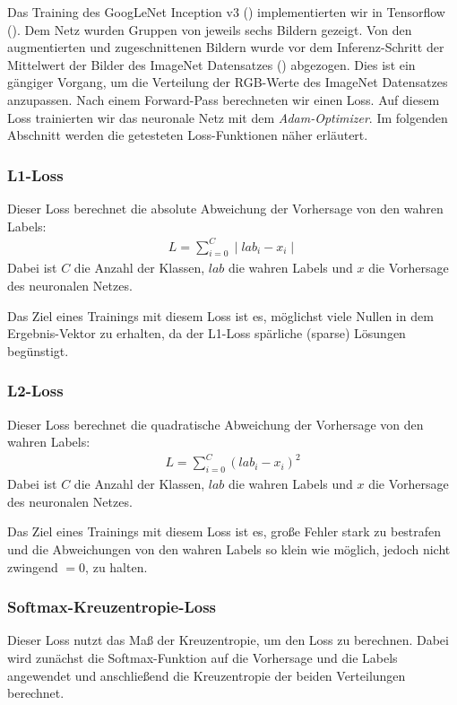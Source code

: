 	Das Training des GoogLeNet Inception v3 (\cite{inception}) implementierten wir in Tensorflow (\cite{tensorflow2015-whitepaper}). Dem Netz wurden Gruppen von jeweils sechs Bildern gezeigt. Von den augmentierten und zugeschnittenen Bildern wurde vor dem Inferenz-Schritt der Mittelwert der Bilder des ImageNet Datensatzes (\cite{russakovsky2015imagenet}) abgezogen. Dies ist ein gängiger Vorgang, um die Verteilung der RGB-Werte des ImageNet Datensatzes anzupassen. Nach einem Forward-Pass berechneten wir einen Loss. Auf diesem Loss trainierten wir das neuronale Netz mit dem \textit{Adam-Optimizer}. Im folgenden Abschnitt werden die getesteten Loss-Funktionen näher erläutert.
	
\subsubsection{L1-Loss}

	Dieser Loss berechnet die absolute Abweichung der Vorhersage von den wahren Labels:
	\begin{align*}
		L = \sum_{i = 0}^C \mid lab_i - x_i\mid
	\end{align*}
	Dabei ist $C$ die Anzahl der Klassen, $lab$ die wahren Labels und $x$ die Vorhersage des neuronalen Netzes.
	
	Das Ziel eines Trainings mit diesem Loss ist es, möglichst viele Nullen in dem Ergebnis-Vektor zu erhalten, da der L1-Loss spärliche (sparse) Lösungen begünstigt.

\subsubsection{L2-Loss}
	Dieser Loss berechnet die quadratische Abweichung der Vorhersage von den wahren Labels:
	\begin{align*}
	L = \sum_{i = 0}^C ( lab_i - x_i)^2
	\end{align*}
	Dabei ist $C$ die Anzahl der Klassen, $lab$ die wahren Labels und $x$ die Vorhersage des neuronalen Netzes.
	
	Das Ziel eines Trainings mit diesem Loss ist es, große Fehler stark zu bestrafen und die Abweichungen von den wahren Labels so klein wie möglich, jedoch nicht zwingend $=0$, zu halten.
	
\subsubsection{Softmax-Kreuzentropie-Loss}
	Dieser Loss nutzt das Maß der Kreuzentropie, um den Loss zu berechnen. Dabei wird zunächst die Softmax-Funktion auf die Vorhersage und die Labels angewendet und anschließend die Kreuzentropie der beiden Verteilungen berechnet.
	
